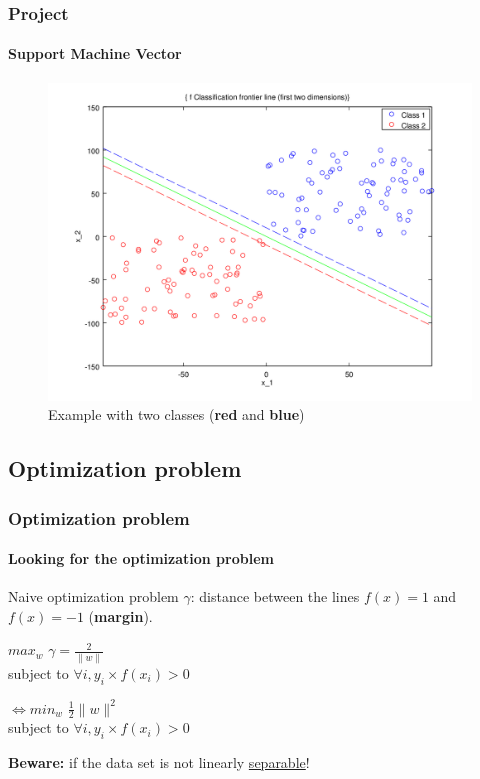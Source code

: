 \documentclass{beamer}
\begin{document}
\begin{frame}
\frametitle{Project}
\framesubtitle{\textbf{Support Machine Vector}}

         \begin{figure}
         \centering
         \caption{Example with two classes (\textbf{red} and \textbf{blue})}
         \includegraphics[scale=0.4]{images/voronoi.png}
         \end{figure}

\end{frame}

\subsection{Optimization problem}

\begin{frame}
\frametitle{Optimization problem}
\framesubtitle{Looking for the optimization problem}

\begin{block}{Naive optimization problem}
$\gamma$: distance between the lines $f(x) = 1$ and $f(x) = -1$ (\textbf{margin}).

\pause

      \begin{center}
        $max_{w}$ $\gamma = \frac{2}{\|w\|}$\\
        subject to $\forall i, y_i \times f(x_i) > 0$\\

\pause

       \bigskip
        $\Leftrightarrow min_{w}$ $\frac{1}{2} \|w\|^2$\\
        subject to $\forall i, y_i \times f(x_i) > 0$\\
      \end{center}

\end{block}

\textbf{Beware:} if the data set is not linearly \underline{separable}!

\end{frame}
\end{document}
